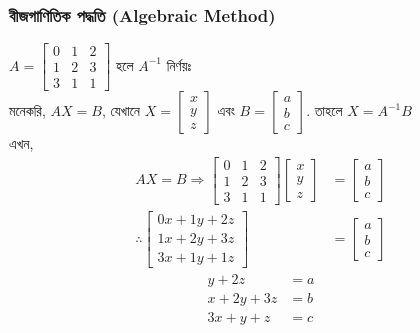 \subsubsection{বীজগাণিতিক পদ্ধতি (Algebraic Method)}
$A=\left[\begin{array}{ccc}
0 & 1 & 2 \\
1 & 2 & 3 \\
3 & 1 & 1
\end{array}\right]$ হলে $A^{-1}$ নির্ণয়ঃ\\
মনেকরি, $AX=B$, যেখানে $X=\left[\begin{array}{c}
x \\
y \\
z
\end{array}\right]$ এবং $B=\left[\begin{array}{c}
a \\
b \\
c
\end{array}\right]$. তাহলে $X=A^{-1}B$\\
এখন, 
\begin{align*}
AX=B \Rightarrow \left[\begin{array}{ccc}
0 & 1 & 2 \\
1 & 2 & 3 \\
3 & 1 & 1
\end{array}\right]\left[\begin{array}{c}
x \\
y \\
z
\end{array}\right] &= \left[\begin{array}{c}
a \\
b \\
c
\end{array}\right] \\
\therefore \left[\begin{array}{c}
0x+1y+2z \\
1x+2y+3z \\
3x+1y+1z
\end{array}\right] &= \left[\begin{array}{c}
a \\
b \\
c
\end{array}\right]
\end{align*}
\begin{align}
	y+2z &= a	\tag{1}\\
	x+2y+3z &= b \tag{2}\\
	3x+y+z  &= c \tag{3}
\end{align}
